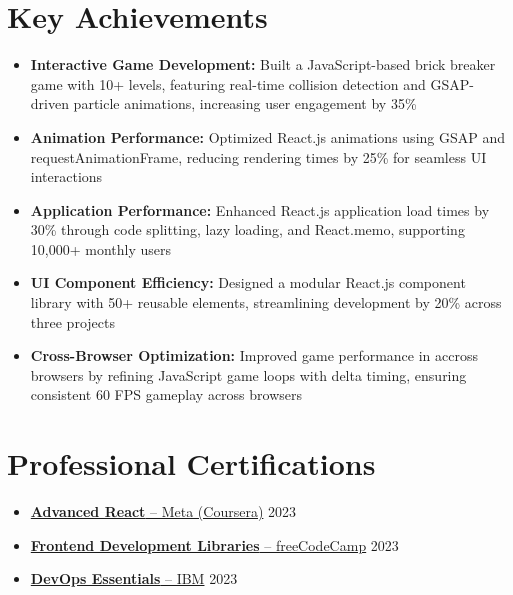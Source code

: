 \documentclass[11pt]{article}
\begin{document}
\section{Key Achievements}
\begin{itemize}
\item \textbf{Interactive Game Development:} Built a JavaScript-based brick breaker game with 10+ levels, featuring real-time collision detection and GSAP-driven particle animations, increasing user engagement by 35\%
\item \textbf{Animation Performance:} Optimized React.js animations using GSAP and requestAnimationFrame, reducing rendering times by 25\% for seamless UI interactions
\item \textbf{Application Performance:} Enhanced React.js application load times by 30\% through code splitting, lazy loading, and React.memo, supporting 10,000+ monthly users
\item \textbf{UI Component Efficiency:} Designed a modular React.js component library with 50+ reusable elements, streamlining development by 20\% across three projects
\item \textbf{Cross-Browser Optimization:} Improved game performance in accross browsers by refining JavaScript game loops with delta timing, ensuring consistent 60 FPS gameplay across browsers
\end{itemize}

\section{Professional Certifications}
\begin{itemize}
\item \href{https://www.coursera.org/account/accomplishments/verify/QC73X86DWCRK}{\textbf{Advanced React} -- Meta (Coursera)} \hfill 2023
\item \href{https://www.freecodecamp.org/certification/fcc36860a3c-366f-4e05-8655-9eeeba048998/front-end-development-libraries}{\textbf{Frontend Development Libraries} -- freeCodeCamp} \hfill 2023
\item \href{https://www.credly.com/badges/41de71d0-506d-4fc4-98b8-3d72b7d4fd44/linked_in_profile}{\textbf{DevOps Essentials} -- IBM} \hfill 2023
\end{itemize}
\end{document}
